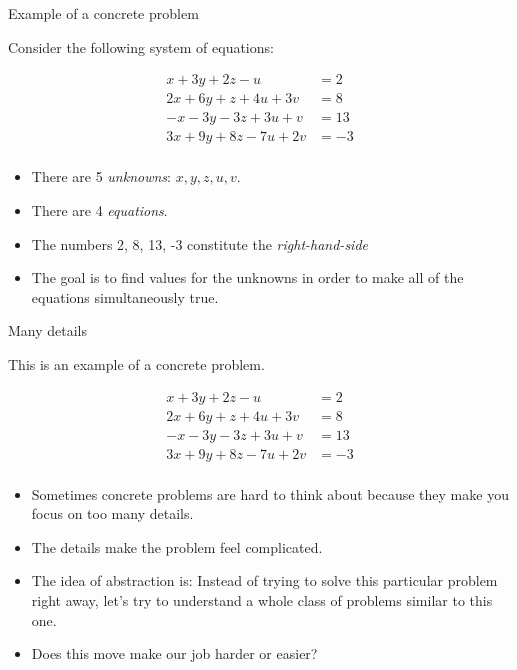 \documentclass{beamer}
\begin{document}
\begin{frame}{Example of a concrete problem}

Consider the following system of equations:

\begin{align*}
 x + 3y + 2z - u  \qquad &= 2 \\
2x + 6y + z + 4u + 3v  &= 8 \\
-x -3y  -3z + 3u + v  &= 13 \\
3x + 9y + 8z  -7u + 2v  &= -3 \\
\end{align*}

\begin{itemize}
\item There are 5 \emph{unknowns}: $x, y, z, u, v$.
\item There are 4 \emph{equations}.
\item The numbers 2, 8, 13, -3 constitute the \emph{right-hand-side}
\item The goal is to find values for the unknowns in order to make all of the
equations simultaneously true.
\end{itemize}

\end{frame}

\begin{frame}{Many details}

This is an example of a concrete problem.

\begin{align*}
 x + 3y + 2z - u  \qquad &= 2 \\
2x + 6y + z + 4u + 3v  &= 8 \\
-x -3y  -3z + 3u + v  &= 13 \\
3x + 9y + 8z  -7u + 2v  &= -3 \\
\end{align*}

\begin{itemize}
\item Sometimes concrete problems are hard to think about because they make you focus on too many details.
\item The details make the problem feel complicated.
\item The idea of abstraction is: Instead of trying to solve this particular problem right away,
let's try to understand a whole class of problems similar to this one.
\item Does this move make our job harder or easier?
\end{itemize}

\end{frame}
\end{document}
